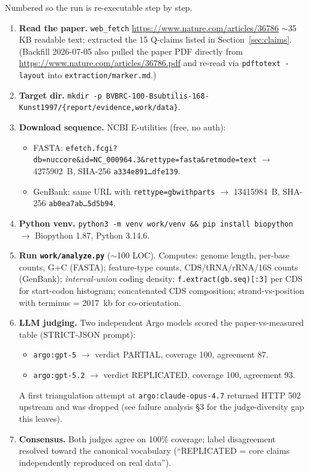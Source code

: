 \documentclass[11pt,letterpaper]{article}
\begin{document}
Numbered so the run is re-executable step by step.
\begin{enumerate}[nosep,leftmargin=1.5em]
\item \textbf{Read the paper.} \texttt{web\_fetch} \url{https://www.nature.com/articles/36786} $\sim$35 KB readable text; extracted the 15 Q-claims listed in Section~\ref{sec:claims}. (Backfill 2026-07-05 also pulled the paper PDF directly from \url{https://www.nature.com/articles/36786.pdf} and re-read via \texttt{pdftotext -layout} into \texttt{extraction/marker.md}.)
\item \textbf{Target dir.} \verb|mkdir -p BVBRC-100-Bsubtilis-168-Kunst1997/{report/evidence,work/data}|.
\item \textbf{Download sequence.} NCBI E-utilities (free, no auth):
  \begin{itemize}[nosep]
  \item FASTA: \verb|efetch.fcgi?db=nuccore&id=NC_000964.3&rettype=fasta&retmode=text| $\rightarrow$ \SI{4275902}{B}, SHA-256 \texttt{a334e891\ldots dfe139}.
  \item GenBank: same URL with \verb|rettype=gbwithparts| $\rightarrow$ \SI{13415984}{B}, SHA-256 \texttt{ab0ea7ab\ldots 5d5b94}.
  \end{itemize}
\item \textbf{Python venv.} \verb|python3 -m venv work/venv && pip install biopython| $\rightarrow$ Biopython 1.87, Python 3.14.6.
\item \textbf{Run \texttt{work/analyze.py}} ($\sim$100 LOC). Computes: genome length, per-base counts, G+C (FASTA); feature-type counts, CDS/tRNA/rRNA/16S counts (GenBank); \emph{interval-union} coding density; \texttt{f.extract(gb.seq)[:3]} per CDS for start-codon histogram; concatenated CDS composition; strand-vs-position with terminus = \SI{2017}{kb} for co-orientation.
\item \textbf{LLM judging.} Two independent Argo models scored the paper-vs-measured table (STRICT-JSON prompt):
  \begin{itemize}[nosep]
  \item \texttt{argo:gpt-5} $\rightarrow$ verdict PARTIAL, coverage 100, agreement 87.
  \item \texttt{argo:gpt-5.2} $\rightarrow$ verdict REPLICATED, coverage 100, agreement 93.
  \end{itemize}
  A first triangulation attempt at \texttt{argo:claude-opus-4.7} returned HTTP 502 upstream and was dropped (see failure analysis \S3 for the judge-diversity gap this leaves).
\item \textbf{Consensus.} Both judges agree on 100\% coverage; label disagreement resolved toward the canonical vocabulary (``REPLICATED = core claims independently reproduced on real data'').
\end{enumerate}
\end{document}
